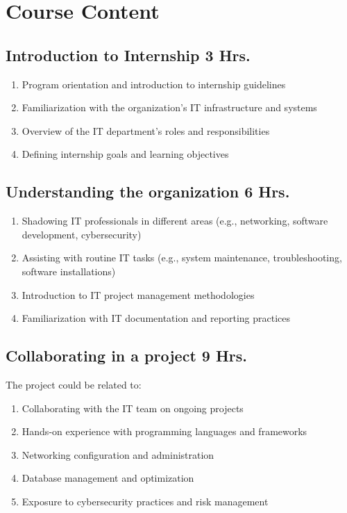 \section{Course Content}



\subsection{Introduction to Internship \hfill 3 Hrs.}

\begin{enumerate}
    \item Program orientation and introduction to internship guidelines
    \item Familiarization with the organization's IT infrastructure and systems
    \item Overview of the IT department's roles and responsibilities
    \item Defining internship goals and learning objectives
\end{enumerate}

\subsection{Understanding the organization \hfill 6 Hrs.}

\begin{enumerate}
    \item Shadowing IT professionals in different areas (e.g., networking, software development, cybersecurity)
    \item Assisting with routine IT tasks (e.g., system maintenance, troubleshooting, software installations)
    \item Introduction to IT project management methodologies
    \item Familiarization with IT documentation and reporting practices
\end{enumerate}

\subsection{Collaborating in a project \hfill 9 Hrs.}
The project could be related to:
\begin{enumerate}
    \item Collaborating with the IT team on ongoing projects
    \item Hands-on experience with programming languages and frameworks
    \item Networking configuration and administration
    \item Database management and optimization
    \item Exposure to cybersecurity practices and risk management
    
\end{enumerate}

